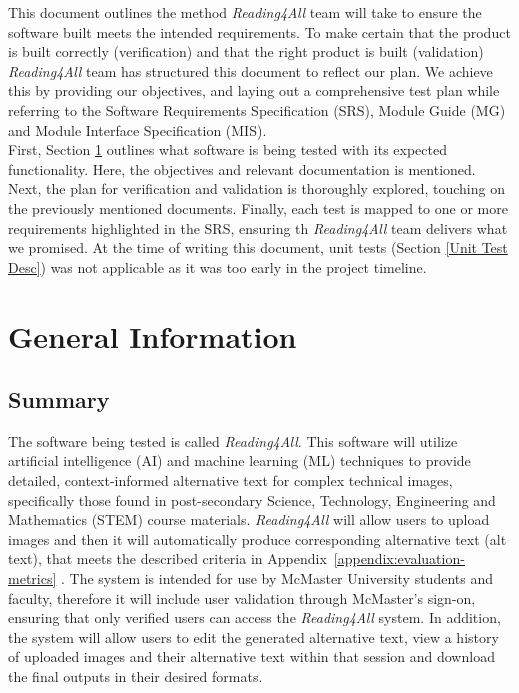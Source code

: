 \documentclass[12pt, titlepage]{article}
\begin{document}
\newpage


\noindent This document outlines the method \textit{Reading4All} team will take to
ensure the software built meets the intended requirements. To make
certain that the product is built correctly (verification) and that
the right product is built (validation) \textit{Reading4All} team has structured this
document to reflect our plan. We achieve this by providing our objectives,
and laying out a comprehensive test plan while referring to the
Software Requirements Specification (SRS), Module
Guide (MG) and Module Interface Specification (MIS). \\

First, Section \ref{geninfo} outlines what software is being tested
with its expected functionality. Here, the objectives and relevant
documentation is mentioned. Next, the plan for verification and
validation is thoroughly explored, touching on the previously
mentioned documents. Finally, each test is mapped to one or more
requirements highlighted in the SRS, ensuring th \textit{Reading4All} team delivers what we promised. At the time
of writing this document, unit tests (Section \ref{Unit Test Desc})
was not applicable as it was too early in the project timeline.\\

\section{General Information} \label{geninfo}

\subsection{Summary}

The software being tested is called \textit{Reading4All}. This
software will utilize artificial intelligence (AI) and machine
learning (ML) techniques to provide detailed, context-informed
alternative text for complex technical images, specifically those
found in post-secondary Science, Technology, Engineering and Mathematics (STEM)
course materials. \textit{Reading4All} will allow users to upload
images and then it will automatically produce corresponding
alternative text (alt text), that
meets the described criteria in
Appendix~\ref{appendix:evaluation-metrics} . The system is intended for use by
McMaster University students and faculty, therefore it will include
user validation through McMaster's sign-on, ensuring that only
verified users can access the \textit{Reading4All} system.
In addition, the system will allow users to edit the generated
alternative text, view a history of uploaded images and their
alternative text within that session and download the final outputs
in their desired formats.
\end{document}
